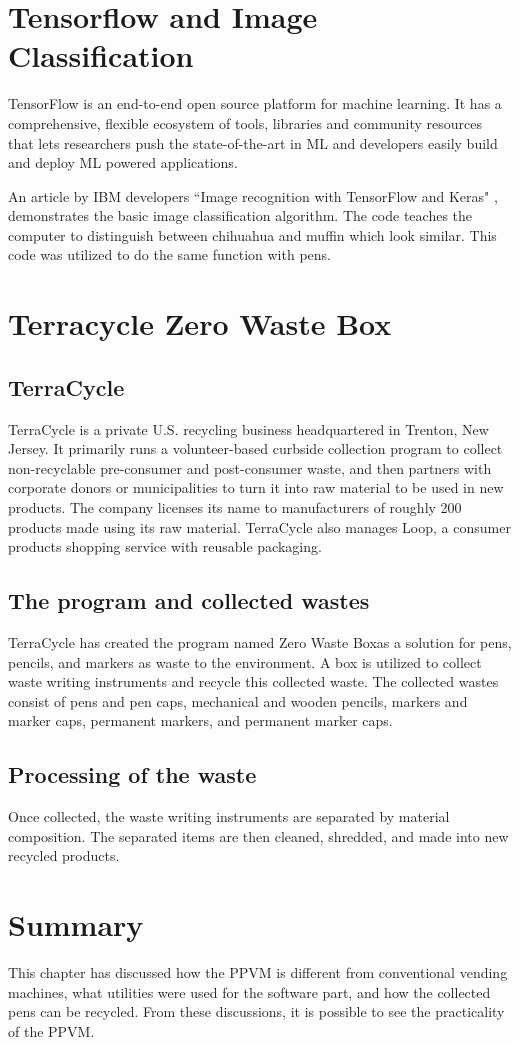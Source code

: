 \section{Tensorflow and Image Classification}\label{tf_sec}

TensorFlow is an end-to-end open source platform for machine learning. It has a comprehensive, flexible ecosystem of tools, libraries and community resources that lets researchers push the state-of-the-art in ML and developers easily build and deploy ML powered applications.\cite{TensorFlow}

An article by IBM developers ``Image recognition with TensorFlow and Keras" \cite{ibm}, demonstrates the basic image classification algorithm. The code teaches the computer to distinguish between chihuahua and muffin which look similar. This code was utilized to do the same function with pens. 

\section{Terracycle Zero Waste Box\texttrademark }

\subsection{TerraCycle}TerraCycle is a private U.S. recycling business headquartered in Trenton, New Jersey. It primarily runs a volunteer-based curbside collection program to collect non-recyclable pre-consumer and post-consumer waste, and then partners with corporate donors or municipalities to turn it into raw material to be used in new products. The company licenses its name to manufacturers of roughly 200 products made using its raw material. TerraCycle also manages Loop, a consumer products shopping service with reusable packaging.\cite{tcycle}

\subsection{The program and collected wastes}
TerraCycle has created the program named Zero Waste Box\texttrademark   as a solution for pens, pencils, and markers as waste to the environment. A box is utilized to collect waste writing instruments and recycle this collected waste. The collected wastes consist of pens and pen caps, mechanical and wooden pencils, markers and marker caps, permanent markers, and permanent marker caps.

\subsection{Processing of the waste}
Once collected, the waste writing instruments are separated by material composition. The separated items are then cleaned, shredded, and made into new recycled products.

\section{Summary}
This chapter has discussed how the PPVM is different from conventional vending machines, what utilities were used for the software part, and how the collected pens can be recycled. From these discussions, it is possible to see the practicality of the PPVM. 
